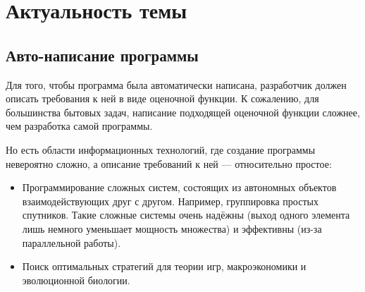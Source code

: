 \documentclass[utf8,a5paper,portrait,10pt]{eskdtext}
\begin{document}


\renewcommand{\ESKDtheTitleFieldVIII}{
\begin{flushleft}
Исполнитель: \hfill Ситник Андрей Андреевич \\
Научный руководитель: \hfill  Амосов Владимир Владимирович \\
Рецензент: \hfill \\
\end{flushleft}}

\renewcommand{\ESKDtheTitleFieldX}{Санкт-Петербург 2001}

\maketitle

\tableofcontents

\newpage
\section{Актуальность темы}

\subsection{Авто-написание программы}

Для того, чтобы программа была автоматически написана, разработчик должен
описать требования к ней в виде оценочной функции. К сожалению, для большинства
бытовых задач, написание подходящей оценочной функции сложнее, чем
разработка самой программы.

Но есть области информационных технологий, где создание программы невероятно
сложно, а описание требований к ней — относительно простое:
\begin{itemize}
  \item Программирование сложных систем, состоящих из автономных объектов
        взаимодействующих друг с другом. Например, группировка простых
        спутников. Такие сложные системы очень надёжны (выход одного элемента
        лишь немного уменьшает мощность множества) и эффективны (из-за
        параллельной работы).
  \item Поиск оптимальных стратегий для теории игр, макроэкономики и
        эволюционной биологии.\cite{communication}
\end{itemize}
\end{document}
